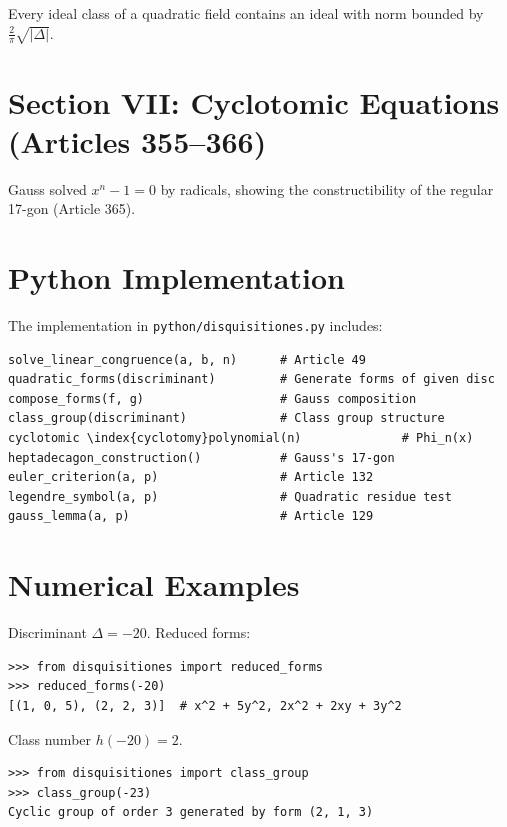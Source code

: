 \begin{theorem}
Every ideal class of a quadratic field contains an ideal with norm bounded by $\frac{2}{\pi}\sqrt{|\Delta|}$.
\end{theorem}

\section{Section VII: Cyclotomic Equations (Articles 355--366)}

Gauss solved $x^n - 1 = 0$ by radicals, showing the constructibility of the regular 17-gon (Article 365).

\section{Python Implementation}

The implementation in \texttt{python/disquisitiones.py} includes:

\begin{lstlisting}[style=python, caption={Key functions in python/disquisitiones.py}]
solve_linear_congruence(a, b, n)      # Article 49
quadratic_forms(discriminant)         # Generate forms of given disc
compose_forms(f, g)                   # Gauss composition
class_group(discriminant)             # Class group structure
cyclotomic \index{cyclotomy}polynomial(n)              # Phi_n(x)
heptadecagon_construction()           # Gauss's 17-gon
euler_criterion(a, p)                 # Article 132
legendre_symbol(a, p)                 # Quadratic residue test
gauss_lemma(a, p)                     # Article 129
\end{lstlisting}

\section{Numerical Examples}

\begin{example}
Discriminant $\Delta = -20$. Reduced forms:
\begin{lstlisting}[style=python]
>>> from disquisitiones import reduced_forms
>>> reduced_forms(-20)
[(1, 0, 5), (2, 2, 3)]  # x^2 + 5y^2, 2x^2 + 2xy + 3y^2
\end{lstlisting}
Class number $h(-20) = 2$.
\end{example}

\begin{example}
\begin{lstlisting}[style=python]
>>> from disquisitiones import class_group
>>> class_group(-23)
Cyclic group of order 3 generated by form (2, 1, 3)
\end{lstlisting}
\end{example}

